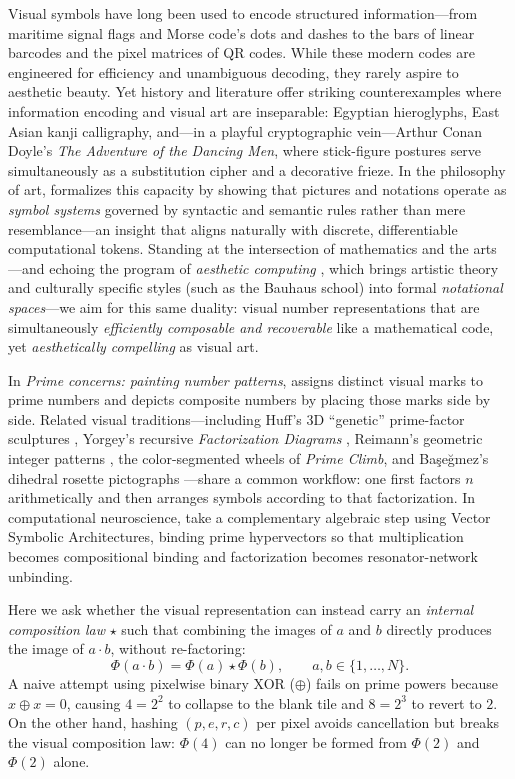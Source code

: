 \documentclass[]{interact}
\theoremstyle{plain}
\theoremstyle{definition}
\theoremstyle{remark}
\begin{document}
Visual symbols have long been used to encode structured information—from maritime signal flags and Morse code's dots and dashes to the bars of linear barcodes and the pixel matrices of QR codes. While these modern codes are engineered for efficiency and unambiguous decoding, they rarely aspire to aesthetic beauty. Yet history and literature offer striking counterexamples where information encoding and visual art are inseparable: Egyptian hieroglyphs, East Asian kanji calligraphy, and—in a playful cryptographic vein—Arthur Conan Doyle's \emph{The Adventure of the Dancing Men}, where stick-figure postures serve simultaneously as a substitution cipher and a decorative frieze. In the philosophy of art, \citet{goodman1968languages} formalizes this capacity by showing that pictures and notations operate as \emph{symbol systems} governed by syntactic and semantic rules rather than mere resemblance—an insight that aligns naturally with discrete, differentiable computational tokens. Standing at the intersection of mathematics and the arts \citep{emmer1993visual,bill1993mathematical}—and echoing the program of \emph{aesthetic computing} \citep{fishwick2006aesthetic}, which brings artistic theory and culturally specific styles (such as the Bauhaus school) into formal \emph{notational spaces}—we aim for this same duality: visual number representations that are simultaneously \emph{efficiently composable and recoverable} like a mathematical code, yet \emph{aesthetically compelling} as visual art.

In \emph{Prime concerns: painting number patterns}, \citet{ashwell2020prime} assigns distinct visual marks to prime numbers and depicts composite numbers by placing those marks side by side. Related visual traditions—including Huff's 3D ``genetic'' prime-factor sculptures \citep{huff2006visually}, Yorgey's recursive \emph{Factorization Diagrams} \citep{yorgey2012factorization}, Reimann's geometric integer patterns \citep{reimann2024visual}, the color-segmented wheels of \emph{Prime Climb}, and Ba\c{s}e\u{g}mez's dihedral rosette pictographs \citep{basegmez2026symmetries}—share a common workflow: one first factors $n$ arithmetically and then arranges symbols according to that factorization. In computational neuroscience, \citet{kleyko2022integer} take a complementary algebraic step using Vector Symbolic Architectures, binding prime hypervectors so that multiplication becomes compositional binding and factorization becomes resonator-network unbinding.

Here we ask whether the visual representation can instead carry an \emph{internal composition law} $\star$ such that combining the images of $a$ and $b$ directly produces the image of $a \cdot b$, without re-factoring:
\begin{equation}
  \Phi(a \cdot b) = \Phi(a) \star \Phi(b), \qquad a, b \in \{1, \dots, N\}.
\end{equation}
A naive attempt using pixelwise binary XOR ($\oplus$) fails on prime powers because $x \oplus x = 0$, causing $4 = 2^2$ to collapse to the blank tile and $8 = 2^3$ to revert to $2$. On the other hand, hashing $(p, e, r, c)$ per pixel avoids cancellation but breaks the visual composition law: $\Phi(4)$ can no longer be formed from $\Phi(2)$ and $\Phi(2)$ alone.
\end{document}
